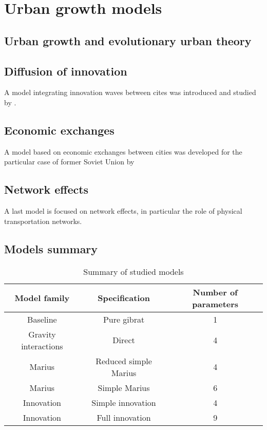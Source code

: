 \documentclass[alpha-refs]{wiley-article}
\begin{document}
\section{Urban growth models}


\subsection{Urban growth and evolutionary urban theory}


\subsection{Diffusion of innovation}

A model integrating innovation waves between cites was introduced and studied by \cite{favaro2011gibrat}.


\subsection{Economic exchanges}

A model based on economic exchanges between cities was developed for the particular case of former Soviet Union by \cite{cottineau2014evolution}


\subsection{Network effects}

A last model is focused on network effects, in particular the role of physical transportation networks.  




\subsection{Models summary}



\begin{table}
	\caption{Summary of studied models}
	\begin{tabular}{|c|c|c}
		Model family & Specification & Number of parameters \\\hline
		Baseline & Pure gibrat & 1 \\
		Gravity interactions & Direct & 4 \\
		Marius & Reduced simple Marius & 4 \\
		Marius & Simple Marius & 6 \\
		Innovation & Simple innovation & 4 \\
		Innovation & Full innovation & 9 \\
	\end{tabular}
	
\end{table}
\end{document}
